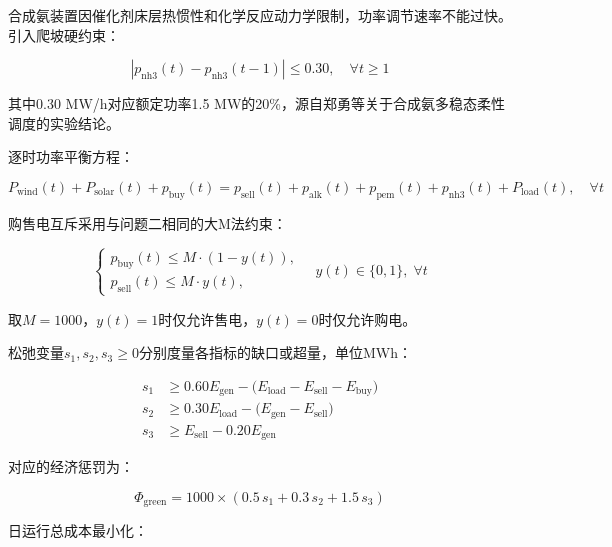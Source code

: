 \documentclass[zihao=-4,a4paper]{ctexart} %
\begin{document}
	合成氨装置因催化剂床层热惯性和化学反应动力学限制，功率调节速率不能过快。引入爬坡硬约束：
	
	\begin{equation}
		|p_{\text{nh3}}(t) - p_{\text{nh3}}(t-1)| \leq 0.30, \quad \forall t \geq 1
		\label{eq:ramp}
	\end{equation}
	
	其中0.30 MW/h对应额定功率1.5 MW的20\%，源自郑勇等\cite{1}关于合成氨多稳态柔性调度的实验结论。
	
	逐时功率平衡方程：
	
	\begin{equation}
		P_{\text{wind}}(t) + P_{\text{solar}}(t) + p_{\text{buy}}(t) = p_{\text{sell}}(t) + p_{\text{alk}}(t) + p_{\text{pem}}(t) + p_{\text{nh3}}(t) + P_{\text{load}}(t), \quad \forall t
		\label{eq:q3_balance}
	\end{equation}
	
	购售电互斥采用与问题二相同的大M法约束：
	
	\begin{equation}
		\begin{cases}
			p_{\text{buy}}(t) \leq M \cdot (1 - y(t)), \\[4pt]
			p_{\text{sell}}(t) \leq M \cdot y(t),
		\end{cases}
		\quad y(t) \in \{0,1\}, \; \forall t
		\label{eq:q3_bigm}
	\end{equation}
	
	取$M = 1000$，$y(t)=1$时仅允许售电，$y(t)=0$时仅允许购电。
	
	松弛变量$s_1,s_2,s_3 \geq 0$分别度量各指标的缺口或超量，单位MWh：
	
	\begin{align}
		s_1 &\geq 0.60 E_{\text{gen}} - \bigl(E_{\text{load}} - E_{\text{sell}} - E_{\text{buy}}\bigr) \label{eq:q3_slack1}\\
		s_2 &\geq 0.30 E_{\text{load}} - \bigl(E_{\text{gen}} - E_{\text{sell}}\bigr) \label{eq:q3_slack2}\\
		s_3 &\geq E_{\text{sell}} - 0.20 E_{\text{gen}} \label{eq:q3_slack3}
	\end{align}
	
	对应的经济惩罚为：
	
	\begin{equation}
		\Phi_{\text{green}} = 1000 \times (0.5 \, s_1 + 0.3 \, s_2 + 1.5 \, s_3)
		\label{eq:q3_phi}
	\end{equation}
	
	日运行总成本最小化：
	
\end{document}
